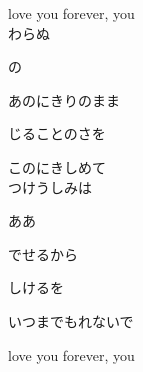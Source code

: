 {love you forever, you
\\

わらぬ

の

あのにきりのまま

じることのさを

このにきしめて
\\

つけうしみは

ああ

でせるから

しけるを

いつまでもれないで

love you forever, you

}